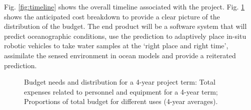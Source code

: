 Fig. \ref{fig:timeline} shows the overall timeline associated with the
\pro project.  Fig. \ref{fig:costs} shows the anticipated cost
breakdown to provide a clear picture of the distribution of the
budget. The end product will be a software system that will predict
oceanographic conditions, use the prediction to adaptively place
in-situ robotic vehicles to take water samples at the ‘right place and
right time’, assimilate the sensed environment in ocean models and
provide a reiterated prediction.

\begin{figure}[!h]
  \centering
  \caption{Budget needs and distribution for a 4-year project term:
     Total expenses related to personnel and
    equipment for a 4-year term;  Proportions of
    total budget for different uses (4-year averages).}
  \label{fig:costs}
  \vspace{-0.5cm}
\end{figure}

